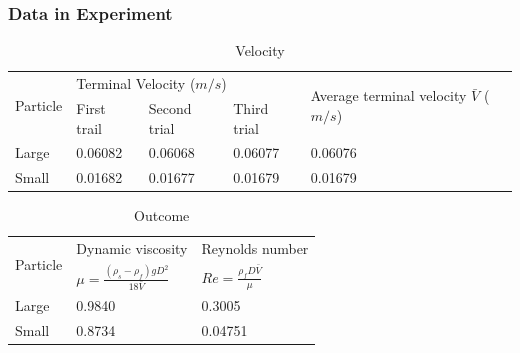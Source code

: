 \documentclass{report}
\begin{document}
\subsubsection{Data in Experiment}
\indent
\begin{table}[H]
\centering
\begin{tabular}{|l|l|l|l|l|}
\hline
\multirow{3}{*}{Particle} & \multicolumn{3}{l|}{Terminal Velocity ($m/s$)}                                                      & \multirow{3}{*}{Average terminal velocity $\bar V$ ($m/s$)} \\ \cline{2-4}
                          & \multirow{2}{*}{First trail} & \multirow{2}{*}{Second trial} & \multirow{2}{*}{Third trial} &                                            \\
                          &                              &                               &                              &                                            \\ \hline
\multirow{2}{*}{Large}        & \multirow{2}{*}{0.06082}     & \multirow{2}{*}{0.06068}      & \multirow{2}{*}{0.06077}     & \multirow{2}{*}{0.06076}                   \\
                          &                              &                               &                              &                                            \\ \hline
\multirow{2}{*}{Small}        & \multirow{2}{*}{0.01682}     & \multirow{2}{*}{0.01677}      & \multirow{2}{*}{0.01679}     & \multirow{2}{*}{0.01679}                   \\
                          &                              &                               &                              &                                            \\ \hline
\end{tabular}
\caption{Velocity}
\label{tab:my-table}
\end{table}
\indent
\begin{table}[H]
\centering
\begin{tabular}{|l|l|l|}
\hline
\multirow{3}{*}{Particle} & Dynamic viscosity       & Reynolds number          \\
                          & \multirow{2}{*}{$\mu = \frac{(\rho_s - \rho_f)gD^2}{18 \bar V}$}      & \multirow{2}{*}{$Re = \frac{\rho_f D \bar V}{\mu}$}       \\
                          &                         &                          \\ \hline
\multirow{2}{*}{Large}    & \multirow{2}{*}{0.9840} & \multirow{2}{*}{0.3005}  \\
                          &                         &                          \\ \hline
\multirow{2}{*}{Small}    & \multirow{2}{*}{0.8734} & \multirow{2}{*}{0.04751} \\
                          &                         &                          \\ \hline
\end{tabular}
\caption{Outcome}
\label{tab:my-table}
\end{table}
\end{document}
